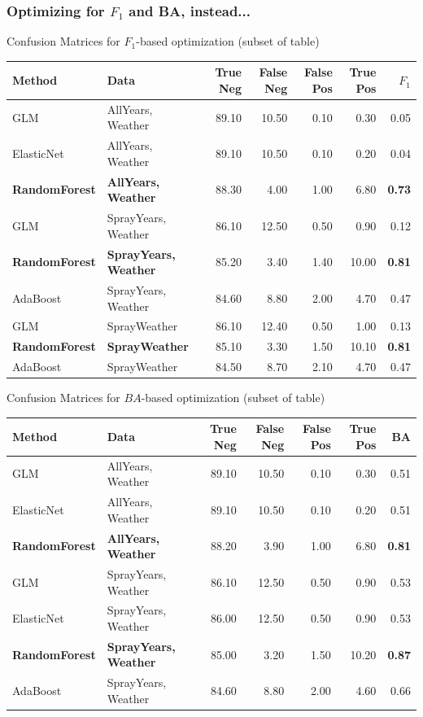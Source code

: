 \documentclass[handout]{beamer}
\begin{document}
\begin{frame}
\frametitle{Optimizing for $F_1$ and BA, instead...}

Confusion Matrices for $F_1$-based optimization (subset of table)
\begin{table}[H] \center \tiny
\begin{tabular}{|ll|rrrrr|} \hline
Method & Data & True Neg & False Neg & False Pos & True Pos & $F_1$ \\ \hline
GLM & AllYears, Weather & 89.10 & 10.50 & 0.10 & 0.30 & 0.05 \\ 
  ElasticNet & AllYears, Weather & 89.10 & 10.50 & 0.10 & 0.20 & 0.04 \\ 
  \bf{RandomForest} & \bf{AllYears, Weather} & 88.30 & 4.00 & 1.00 & 6.80 & \bf{0.73} \\ \hline

  GLM & SprayYears, Weather & 86.10 & 12.50 & 0.50 & 0.90 & 0.12 \\ 
  \bf{RandomForest} & \bf{SprayYears, Weather} & 85.20 & 3.40 & 1.40 & 10.00 & \bf{0.81} \\ 
  AdaBoost & SprayYears, Weather & 84.60 & 8.80 & 2.00 & 4.70 & 0.47 \\ \hline

  GLM & SprayWeather & 86.10 & 12.40 & 0.50 & 1.00 & 0.13 \\ 
  \bf{RandomForest} & \bf{SprayWeather} & 85.10 & 3.30 & 1.50 & 10.10 & \bf{0.81} \\ 
  AdaBoost & SprayWeather & 84.50 & 8.70 & 2.10 & 4.70 & 0.47 \\ \hline
\end{tabular}
\end{table}

Confusion Matrices for $BA$-based optimization (subset of table)
\begin{table}[H] \center \tiny
\begin{tabular}{|ll|rrrrr|} \hline
Method & Data & True Neg & False Neg & False Pos & True Pos & BA \\ \hline
GLM & AllYears, Weather & 89.10 & 10.50 & 0.10 & 0.30 & 0.51 \\ 
  ElasticNet & AllYears, Weather & 89.10 & 10.50 & 0.10 & 0.20 & 0.51 \\ 
  \bf{RandomForest} & \bf{AllYears, Weather} & 88.20 & 3.90 & 1.00 & 6.80 & \bf{0.81} \\ \hline

  GLM & SprayYears, Weather & 86.10 & 12.50 & 0.50 & 0.90 & 0.53 \\ 
  ElasticNet & SprayYears, Weather & 86.00 & 12.50 & 0.50 & 0.90 & 0.53 \\ 
  \bf{RandomForest} & \bf{SprayYears, Weather} & 85.00 & 3.20 & 1.50 & 10.20 & \bf{0.87} \\ 
  AdaBoost & SprayYears, Weather & 84.60 & 8.80 & 2.00 & 4.60 & 0.66 \\ \hline


\end{tabular}
\end{table}
\end{frame}
\end{document}
